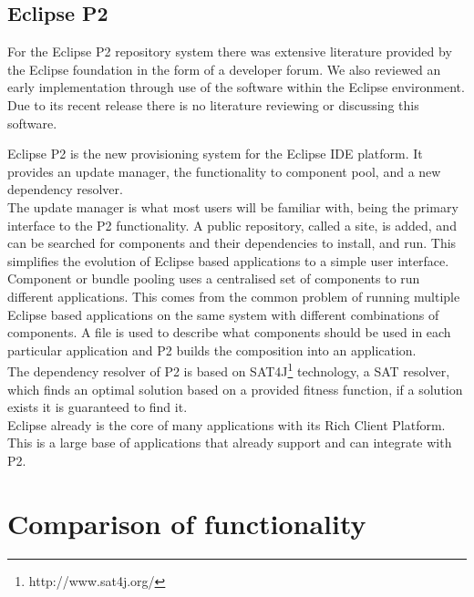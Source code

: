 \subsection{Eclipse P2}

For the Eclipse P2 repository system there was extensive literature provided by the Eclipse foundation in the form of a developer forum.
We also reviewed an early implementation through use of the software within the Eclipse environment.
Due to its recent release there is no literature reviewing or discussing this software.

Eclipse P2
is the new provisioning system for the Eclipse IDE platform.
It provides an update manager, the functionality to component pool, and a new dependency resolver.\\
The update manager is what most users will be familiar with, being the primary interface to the P2 functionality. 
A public repository, called a site, is added, and can be searched for components and their dependencies to install, and run.
This simplifies the evolution of Eclipse based applications to a simple user interface.\\
Component or bundle pooling uses a centralised set of components to run different applications.
This comes from the common problem of running multiple Eclipse based applications on the same system with different combinations of components.
A file is used to describe what components should be used in each particular application and P2 builds the composition into an application.\\
The dependency resolver of P2 is based on SAT4J\footnote{http://www.sat4j.org/} technology, a SAT resolver, which finds an optimal solution based on
a provided fitness function, if a solution exists it is guaranteed to find it.\\  
Eclipse already is
the core of many applications with its Rich Client Platform. This is a large base of applications that already support and can integrate with P2.

\section{Comparison of functionality}







